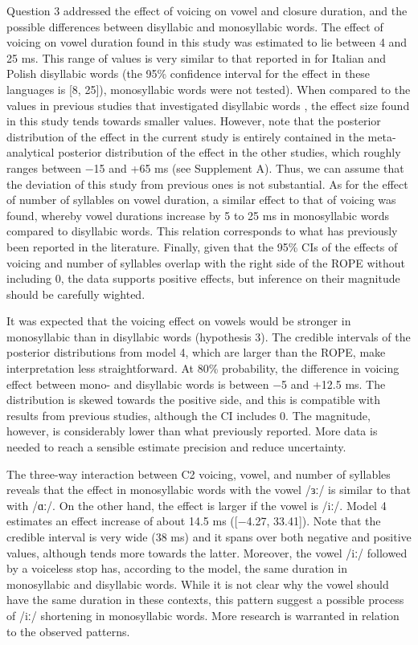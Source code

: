 \documentclass[
  12pt,
  a4paper,
]{article}
\begin{document}
Question 3 addressed the effect of voicing on vowel and closure
duration, and the possible differences between disyllabic and
monosyllabic words. The effect of voicing on vowel duration found in
this study was estimated to lie between 4 and 25 ms. This range of
values is very similar to that reported in \citet{coretta2018j} for
Italian and Polish disyllabic words (the 95\% confidence interval for
the effect in these languages is {[}8, 25{]}), monosyllabic words were
not tested). When compared to the values in previous studies that
investigated disyllabic words \citep{sharf1962, klatt1973, davis1989},
the effect size found in this study tends towards smaller values.
However, note that the posterior distribution of the effect in the
current study is entirely contained in the meta-analytical posterior
distribution of the effect in the other studies, which roughly ranges
between −15 and +65 ms (see Supplement A). Thus, we can assume that the
deviation of this study from previous ones is not substantial. As for
the effect of number of syllables on vowel duration, a similar effect to
that of voicing was found, whereby vowel durations increase by 5 to 25
ms in monosyllabic words compared to disyllabic words. This relation
corresponds to what has previously been reported in the literature.
Finally, given that the 95\% CIs of the effects of voicing and number of
syllables overlap with the right side of the ROPE without including 0,
the data supports positive effects, but inference on their magnitude
should be carefully wighted.

It was expected that the voicing effect on vowels would be stronger in
monosyllabic than in disyllabic words (hypothesis 3). The credible
intervals of the posterior distributions from model 4, which are larger
than the ROPE, make interpretation less straightforward. At 80\%
probability, the difference in voicing effect between mono- and
disyllabic words is between −5 and +12.5 ms. The distribution is skewed
towards the positive side, and this is compatible with results from
previous studies, although the CI includes 0. The magnitude, however, is
considerably lower than what previously reported. More data is needed to
reach a sensible estimate precision and reduce uncertainty.

The three-way interaction between C2 voicing, vowel, and number of
syllables reveals that the effect in monosyllabic words with the vowel
/ɜː/ is similar to that with /ɑː/. On the other hand, the effect is
larger if the vowel is /iː/. Model 4 estimates an effect increase of
about 14.5 ms ({[}−4.27, 33.41{]}). Note that the credible interval is
very wide (38 ms) and it spans over both negative and positive values,
although tends more towards the latter. Moreover, the vowel /iː/
followed by a voiceless stop has, according to the model, the same
duration in monosyllabic and disyllabic words. While it is not clear why
the vowel should have the same duration in these contexts, this pattern
suggest a possible process of /iː/ shortening in monosyllabic words.
More research is warranted in relation to the observed patterns.
\end{document}
